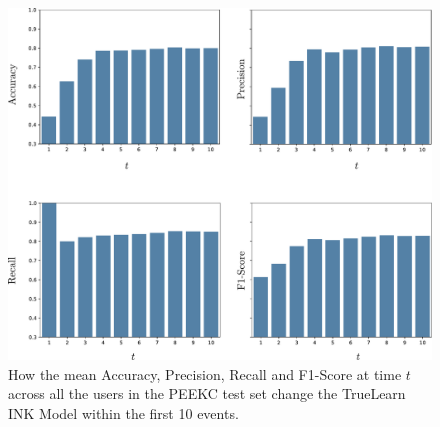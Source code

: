 \documentclass[letterpaper]{article} %
\begin{document}
\begin{figure}[h] 
\begin{center}
    \centerline{\includegraphics[width=\linewidth]{ink_metrics.pdf}}
    \caption{How the mean Accuracy, Precision, Recall and F1-Score at time $t$ across all the users in the PEEKC test set change the TrueLearn INK Model within the first 10 events.}
    \label{fig:INK_MET}
\end{center}
\end{figure}

\newpage
\end{document}
